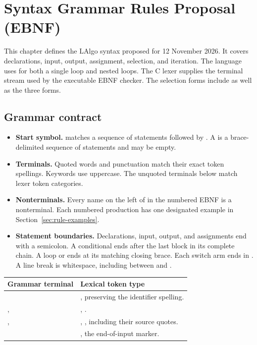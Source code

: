 \clearpage
\section{Syntax Grammar Rules Proposal (EBNF)}
\label{sec:syntax-proposal}

This chapter defines the LAlgo syntax proposed for 12 November 2026. It covers declarations, input, output, assignment, selection, and iteration. The language uses  for both a single loop and nested loops. The C lexer supplies the terminal stream used by the executable EBNF checker. The selection forms include  as well as the three  forms.

\subsection{Grammar contract}

\begin{itemize}
  \item \textbf{Start symbol.}  matches a sequence of statements followed by . A  is a brace-delimited sequence of statements and may be empty.
  \item \textbf{Terminals.} Quoted words and punctuation match their exact token spellings. Keywords use uppercase. The unquoted terminals below match lexer token categories.
  \item \textbf{Nonterminals.} Every name on the left of \codeinline{=} in the numbered EBNF is a nonterminal. Each numbered production has one designated example in Section~\ref{sec:rule-examples}.
  \item \textbf{Statement boundaries.} Declarations, input, output, and assignments end with a semicolon. A conditional ends after the last block in its complete chain. A loop or  ends at its matching closing brace. Each switch arm ends in . A line break is whitespace, including between  and .
\end{itemize}

\begin{tabularx}{\linewidth}{@{}L{39mm}Y@{}}
\toprule
\textbf{Grammar terminal} & \textbf{Lexical token type} \\
\midrule
{} & , preserving the identifier spelling. \\
,  & , . \\
,  & , , including their source quotes. \\
 & , the end-of-input marker. \\
\bottomrule
\end{tabularx}

